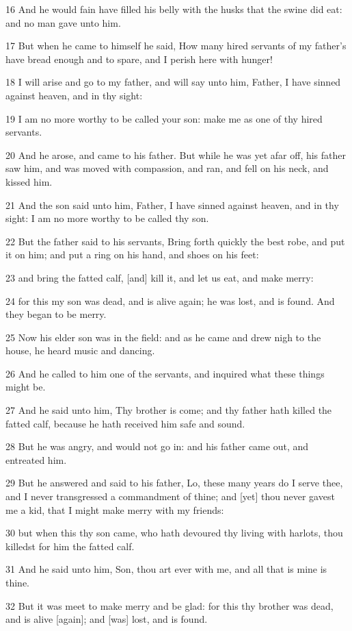 \par 16 And he would fain have filled his belly with the husks that the swine did eat: and no man gave unto him.
\par 17 But when he came to himself he said, How many hired servants of my father's have bread enough and to spare, and I perish here with hunger!
\par 18 I will arise and go to my father, and will say unto him, Father, I have sinned against heaven, and in thy sight:
\par 19 I am no more worthy to be called your son: make me as one of thy hired servants.
\par 20 And he arose, and came to his father. But while he was yet afar off, his father saw him, and was moved with compassion, and ran, and fell on his neck, and kissed him.
\par 21 And the son said unto him, Father, I have sinned against heaven, and in thy sight: I am no more worthy to be called thy son.
\par 22 But the father said to his servants, Bring forth quickly the best robe, and put it on him; and put a ring on his hand, and shoes on his feet:
\par 23 and bring the fatted calf, [and] kill it, and let us eat, and make merry:
\par 24 for this my son was dead, and is alive again; he was lost, and is found. And they began to be merry.
\par 25 Now his elder son was in the field: and as he came and drew nigh to the house, he heard music and dancing.
\par 26 And he called to him one of the servants, and inquired what these things might be.
\par 27 And he said unto him, Thy brother is come; and thy father hath killed the fatted calf, because he hath received him safe and sound.
\par 28 But he was angry, and would not go in: and his father came out, and entreated him.
\par 29 But he answered and said to his father, Lo, these many years do I serve thee, and I never transgressed a commandment of thine; and [yet] thou never gavest me a kid, that I might make merry with my friends:
\par 30 but when this thy son came, who hath devoured thy living with harlots, thou killedst for him the fatted calf.
\par 31 And he said unto him, Son, thou art ever with me, and all that is mine is thine.
\par 32 But it was meet to make merry and be glad: for this thy brother was dead, and is alive [again]; and [was] lost, and is found.

